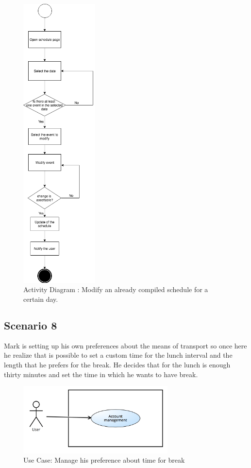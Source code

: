 \documentclass[numbers=noenddot, 12pt, a4paper, oneside]{scrbook}
\begin{document}
\begin{figure}[H]
	\centering
	\includegraphics[width=0.35\textwidth]{flows/Scenario7}
	\caption{Activity Diagram : Modify an already compiled schedule for a certain day.}
\end{figure}

\newpage
\subsection*{Scenario 8}

Mark is setting up his own preferences about the means of transport so once here he realize that is possible to set a custom time for the lunch interval and the length that he prefers for the break. He decides that for the lunch is enough thirty minutes and set the time in which he wants to have break.
\\
\begin{figure}[H]
	\includegraphics[width=0.7\textwidth]{usecases/Scenario8}
	\caption{Use Case: Manage his preference about time for break}
\end{figure}
\end{document}
